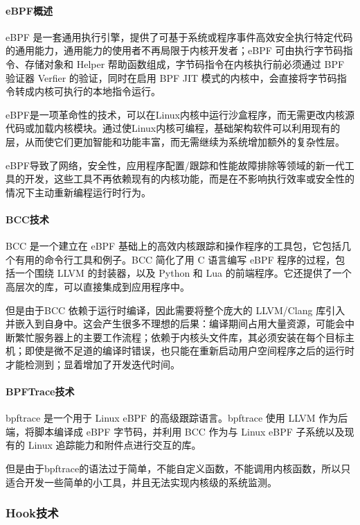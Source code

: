 \documentclass[12pt,a4paper]{ctexart}
\begin{document}
\paragraph{eBPF概述}
eBPF 是一套通用执行引擎，提供了可基于系统或程序事件高效安全执行特定代码的通用能力，通用能力的使用者不再局限于内核开发者；eBPF 可由执行字节码指令、存储对象和 Helper 帮助函数组成，字节码指令在内核执行前必须通过 BPF 验证器 Verfier 的验证，同时在启用 BPF JIT 模式的内核中，会直接将字节码指令转成内核可执行的本地指令运行。


eBPF是一项革命性的技术，可以在Linux内核中运行沙盒程序，而无需更改内核源代码或加载内核模块。通过使Linux内核可编程，基础架构软件可以利用现有的层，从而使它们更加智能和功能丰富，而无需继续为系统增加额外的复杂性层。


eBPF导致了网络，安全性，应用程序配置/跟踪和性能故障排除等领域的新一代工具的开发，这些工具不再依赖现有的内核功能，而是在不影响执行效率或安全性的情况下主动重新编程运行时行为。

\paragraph{BCC技术}
BCC 是一个建立在 eBPF 基础上的高效内核跟踪和操作程序的工具包，它包括几个有用的命令行工具和例子。BCC 简化了用 C 语言编写 eBPF 程序的过程，包括一个围绕 LLVM 的封装器，以及 Python 和 Lua 的前端程序。它还提供了一个高层次的库，可以直接集成到应用程序中。


但是由于BCC 依赖于运行时编译，因此需要将整个庞大的 LLVM/Clang 库引入并嵌入到自身中。这会产生很多不理想的后果：编译期间占用大量资源，可能会中断繁忙服务器上的主要工作流程；依赖于内核头文件库，其必须安装在每个目标主机；即使是微不足道的编译时错误，也只能在重新启动用户空间程序之后的运行时才能检测到；显着增加了开发迭代时间。

\paragraph{BPFTrace技术}
bpftrace 是一个用于 Linux eBPF 的高级跟踪语言。bpftrace 使用 LLVM 作为后端，将脚本编译成 eBPF 字节码，并利用 BCC 作为与 Linux eBPF 子系统以及现有的 Linux 追踪能力和附件点进行交互的库。


但是由于bpftrace的语法过于简单，不能自定义函数，不能调用内核函数，所以只适合开发一些简单的小工具，并且无法实现内核级的系统监测。

\subsubsection{Hook技术}
\end{document}
